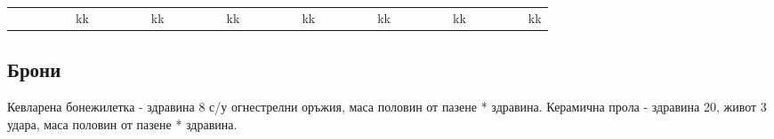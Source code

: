 \begin{tabular}{p{2cm} | p{2cm} | p{2cm} | p{2cm} | p{2cm} | p{2cm} | p{2cm}}
                      &                      &            &            &                &                          kk
                      &                      &            &            &                &                          kk
                      &                      &            &            &                &                          kk
                      &                      &            &            &                &                          kk
                      &                      &            &            &                &                          kk
                      &                      &            &            &                &                          kk
                      &                      &            &            &                &                          kk

\end{tabular}

\subsection{Брони}
Кевларена бонежилетка - здравина 8 с/у огнестрелни оръжия, маса половин от пазене * здравина.
Керамична прола - здравина 20, живот 3 удара, маса половин от пазене * здравина.

